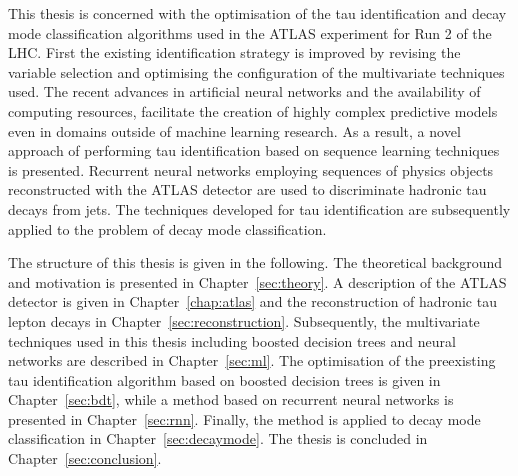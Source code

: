 This thesis is concerned with the optimisation of the tau identification and
decay mode classification algorithms used in the ATLAS experiment for Run 2 of
the LHC. First the existing identification strategy is improved by revising the
variable selection and optimising the configuration of the multivariate
techniques used. The recent advances in artificial neural networks and the
availability of computing resources, facilitate the creation of highly complex
predictive models even in domains outside of machine learning research. As a
result, a novel approach of performing tau identification based on sequence
learning techniques is presented. Recurrent neural networks employing sequences
of physics objects reconstructed with the ATLAS detector are used to
discriminate hadronic tau decays from jets. The techniques developed for tau
identification are subsequently applied to the problem of decay mode
classification.

The structure of this thesis is given in the following. The theoretical
background and motivation is presented in Chapter~\ref{sec:theory}. A
description of the ATLAS detector is given in Chapter~\ref{chap:atlas} and the
reconstruction of hadronic tau lepton decays in
Chapter~\ref{sec:reconstruction}. Subsequently, the multivariate techniques used
in this thesis including boosted decision trees and neural networks are
described in Chapter~\ref{sec:ml}. The optimisation of the preexisting tau
identification algorithm based on boosted decision trees is given in
Chapter~\ref{sec:bdt}, while a method based on recurrent neural networks is
presented in Chapter~\ref{sec:rnn}. Finally, the method is applied to decay mode
classification in Chapter~\ref{sec:decaymode}. The thesis is concluded in
Chapter~\ref{sec:conclusion}.

